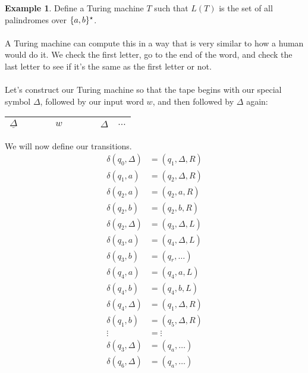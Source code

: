\documentclass[]{article}
\DeclarePairedDelimiter{\set}{\lbrace}{\rbrace}
\theoremstyle{definition}
\newtheorem{ex}{Example}[section]
\begin{document}
    \begin{ex}
      Define a Turing machine $T$ such that $L(T)$ is the set of all palindromes over $\set{a, b}^\star$.
      \\ \\
      A Turing machine can compute this in a way that is very similar to how a human would do it. We check the first letter, go to the end of the word, and check the last letter to see if it's the same as the first letter or not.
      \\ \\
      Let's construct our Turing machine so that the tape begins with our special symbol $\Delta$, followed by our input word $w$, and then followed by $\Delta$ again:
      \begin{center}
        \begin{tabular}{|c|ccccccc|c|c}
          \hline
          $\underline{\Delta}$ & & & & $w$ & & & & $\Delta$ & $\ldots$ \\ \hline
        \end{tabular}
      \end{center}

      We will now define our transitions.
      \begin{align*}
        \delta(q_0, \Delta) &= (q_1, \Delta, R) \\
        \delta(q_1, a) &= (q_2, \Delta, R) \\
        \delta(q_2, a) &= (q_2, a, R) \\
        \delta(q_2, b) &= (q_2, b, R) \\
        \delta(q_2, \Delta) &= (q_3, \Delta, L) \\
        \delta(q_3, a) &= (q_4, \Delta, L) \\
        \delta(q_3, b) &= (q_r, \ldots) \\
        \delta(q_4, a) &= (q_4, a, L) \\
        \delta(q_4, b) &= (q_4, b, L) \\
        \delta(q_4, \Delta) &= (q_1, \Delta, R) \\
        \delta(q_1, b) &= (q_5, \Delta, R) \\
        \vdots &= \vdots \\
        \delta(q_3, \Delta) &= (q_a, \ldots) \\
        \delta(q_6, \Delta) &= (q_a, \ldots)
      \end{align*}


\end{ex}
\end{document}
